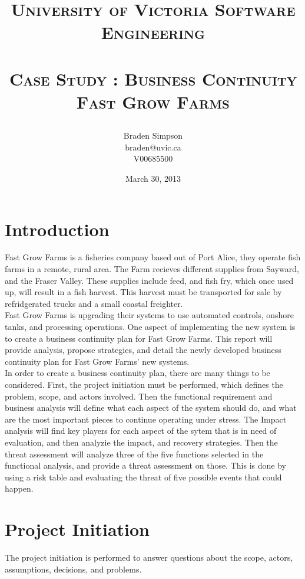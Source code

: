 \documentclass{article}
\title{
\large{\textsc{University of Victoria Software Engineering}}\huge\\ [0pt] %
\horrule{0.5pt}\\[0.4cm]
\textsc{Case Study : Business Continuity\\Fast Grow Farms}\\
\author{Braden Simpson\\braden@uvic.ca\\V00685500}
\date{March 30, 2013}
}
\numberwithin{equation}{section} %
\numberwithin{figure}{section} %
\numberwithin{table}{section} %
\begin{document}
\maketitle %


\section{Introduction}
Fast Grow Farms is a fisheries company based out of Port Alice, they operate fish farms in a remote, rural area.  The Farm recieves different supplies from Sayward, and the Fraser Valley.  These supplies include feed, and fish fry, which once used up, will result in a fish harvest. This harvest must be transported for sale by refridgerated trucks and a small coastal freighter. \\ 

Fast Grow Farms is upgrading their systems to use automated controls, onshore tanks, and processing operations.  One aspect of implementing the new system is to create a business continuity plan for Fast Grow Farms.  This report will provide analysis, propose strategies, and detail the newly developed business continuity plan for Fast Grow Farms' new systems. \\

In order to create a business continuity plan, there are many things to be considered.  First, the project initiation must be performed, which defines the problem, scope, and actors involved.  Then the functional requirement and business analysis will define what each aspect of the system should do, and what are the most important pieces to continue operating under stress.  The Impact analysis will find key players for each aspect of the sytem that is in need of evaluation, and then analyzie the impact, and recovery strategies.  Then the threat assessment will analyze three of the five functions selected in the functional analysis, and provide a threat assessment on those.  This is done by using a risk table and evaluating the threat of five possible events that could happen. 

\section{Project Initiation}
\label{sec:init}
The project initiation is performed to answer questions about the scope, actors, assumptions, decisions, and problems.
\end{document}
